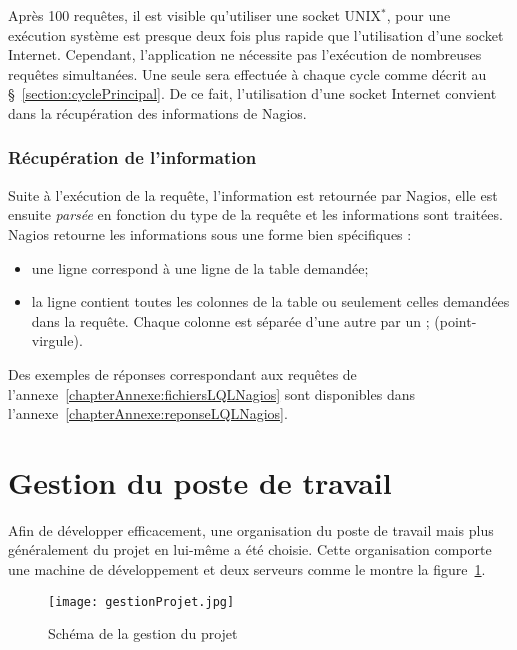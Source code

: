 Apr\`es 100 requ\^etes, il est visible qu'utiliser une socket UNIX$^*$, pour une ex\'ecution syst\`eme est presque deux fois plus rapide que l'utilisation d'une socket Internet.
Cependant, l'application ne n\'ecessite pas l'ex\'ecution de nombreuses requ\^etes simultan\'ees.
Une seule sera effectu\'ee \`a chaque cycle comme d\'ecrit au \S~\ref{section:cyclePrincipal}.
De ce fait, l'utilisation d'une socket Internet convient dans la r\'ecup\'eration des informations de Nagios.

\subsubsection{R\'ecup\'eration de l'information}

Suite \`a l'ex\'ecution de la requ\^ete, l'information est retourn\'ee par Nagios, elle est ensuite \textit{pars\'ee} en fonction du type de la requ\^ete et les informations sont trait\'ees.
Nagios retourne les informations sous une forme bien sp\'ecifiques : 

\begin{itemize}
	\item une ligne correspond \`a une ligne de la table demand\'ee;
	\item la ligne contient toutes les colonnes de la table ou seulement celles demand\'ees dans la requ\^ete.
	Chaque colonne est s\'epar\'ee d'une autre par un \textsf{; (point-virgule)}.

\end{itemize}

\vspace{0.20cm}

Des exemples de r\'eponses correspondant aux requ\^etes de l'annexe~\ref{chapterAnnexe:fichiersLQLNagios} sont disponibles dans l'annexe~\ref{chapterAnnexe:reponseLQLNagios}.

\section{Gestion du poste de travail}
\label{section:gestionProjet}

Afin de d\'evelopper efficacement, une organisation du poste de travail mais plus g\'en\'eralement du projet en lui-m\^eme a \'et\'e choisie.
Cette organisation comporte une machine de d\'eveloppement et deux serveurs comme le montre la figure~\ref{figure:gestionProjet}.

\begin{figure}[!ht]
	\centering
	\texttt{[image: gestionProjet.jpg]}
	\caption{Sch\'ema de la gestion du projet}
	\label{figure:gestionProjet}

\end{figure}

